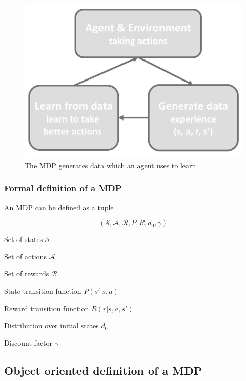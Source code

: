 \documentclass[]{article}
\begin{document}
\begin{figure}
\centering
\includegraphics[width=\textwidth,height=0.2\textheight]{./tex2pdf.-4c1708fb449e9e84/78093fdd7ea165ed93d07e7605ed0289ecc8deb0.png}
\caption{The MDP generates data which an agent uses to learn}
\end{figure}

\newpage

\hypertarget{formal-definition-of-a-mdp}{%
\subsubsection{Formal definition of a
MDP}\label{formal-definition-of-a-mdp}}

An MDP can be defined as a tuple

\[(\mathcal{S}, \mathcal{A}, \mathcal{R}, P, R, d_0, \gamma)\]

Set of states \(\mathcal{S}\)

Set of actions \(\mathcal{A}\)

Set of rewards \(\mathcal{R}\)

State transition function \(P(s'|s,a)\)

Reward transition function \(R(r|s,a,s')\)

Distribution over initial states \(d_0\)

Discount factor \(\gamma\)

\hypertarget{object-oriented-definition-of-a-mdp}{%
\subsection{Object oriented definition of a
MDP}\label{object-oriented-definition-of-a-mdp}}
\end{document}
